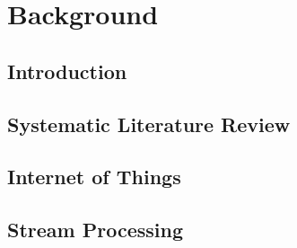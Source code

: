 \chapter{Background}


\section{Introduction}


\section{Systematic Literature Review}


\section{Internet of Things}


\section{Stream Processing}


